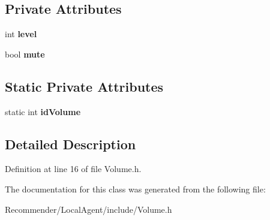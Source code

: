\subsection*{Private Attributes}
\begin{CompactItemize}
\item 
int {\bf level}\label{classbr_1_1ufscar_1_1lince_1_1ginga_1_1recommender_1_1Volume_cf4d33ee4cff36f69b924471174dcb11}

\item 
bool {\bf mute}\label{classbr_1_1ufscar_1_1lince_1_1ginga_1_1recommender_1_1Volume_f8ecab1d42a22edf12049a5c9b81fca9}

\end{CompactItemize}
\subsection*{Static Private Attributes}
\begin{CompactItemize}
\item 
static int {\bf idVolume}\label{classbr_1_1ufscar_1_1lince_1_1ginga_1_1recommender_1_1Volume_708509f950bbbaf34b588c8104ef84c0}

\end{CompactItemize}


\subsection{Detailed Description}




Definition at line 16 of file Volume.h.

The documentation for this class was generated from the following file:\begin{CompactItemize}
\item 
Recommender/LocalAgent/include/Volume.h\end{CompactItemize}
